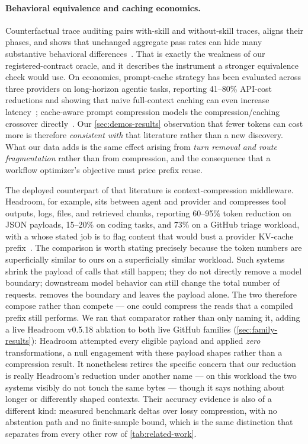\paragraph{Behavioral equivalence and caching economics.}
Counterfactual trace auditing pairs with-skill and without-skill traces, aligns their
phases, and shows that unchanged aggregate pass rates can hide many substantive behavioral
differences~\cite{zhou2026cta}.  That is exactly the weakness of our registered-contract
oracle, and it describes the instrument a stronger equivalence check would use.  On
economics, prompt-cache strategy has been evaluated across three providers on long-horizon
agentic tasks, reporting 41--80\% API-cost reductions and showing that naive full-context
caching can even increase latency~\cite{lumer2026cache}; cache-aware prompt compression
models the compression/caching crossover directly~\cite{song2026capc}.  Our
\cref{sec:demos-results} observation that fewer tokens can cost more is therefore
\emph{consistent with} that literature rather than a new discovery.  What our data adds is
the same effect arising from \emph{turn removal and route fragmentation} rather than from
compression, and the consequence that a workflow optimizer's objective must price prefix
reuse.

The deployed counterpart of that literature is context\hyp{}compression middleware.  Headroom,
for example, sits between agent and provider and compresses tool outputs, logs, files, and
retrieved chunks, reporting 60--95\% token reduction on {JSON} payloads, 15--20\% on coding
tasks, and 73\% on a GitHub triage workload, with a  whose stated job is
to flag content that would bust a provider {KV}-cache prefix~\cite{headroom2026}.  The
comparison is worth stating precisely because the token numbers are superficially similar
to ours on a superficially similar workload.  Such systems shrink the payload of calls
that still happen; they do not directly remove a model boundary; downstream model behavior can
still change the total number of requests.  \method removes the boundary and leaves the payload alone.  The two
therefore compose rather than compete --- one could compress the reads that a compiled
prefix still performs.  We ran that comparator rather than only naming it, adding a live
Headroom v0.5.18 ablation to both live GitHub families (\cref{sec:family-results}):
Headroom attempted every eligible payload and applied \emph{zero} transformations, a null
engagement with these payload shapes rather than a compression result.  It nonetheless
retires the specific concern that our reduction is really Headroom's reduction under
another name --- on this workload the two systems visibly do not touch the same bytes ---
though it says nothing about longer or differently shaped contexts.
Their accuracy evidence is also of a different kind: measured benchmark deltas over
lossy compression, with no abstention path and no finite-sample bound, which is the same
distinction that separates \method from every other row of \cref{tab:related-work}.

